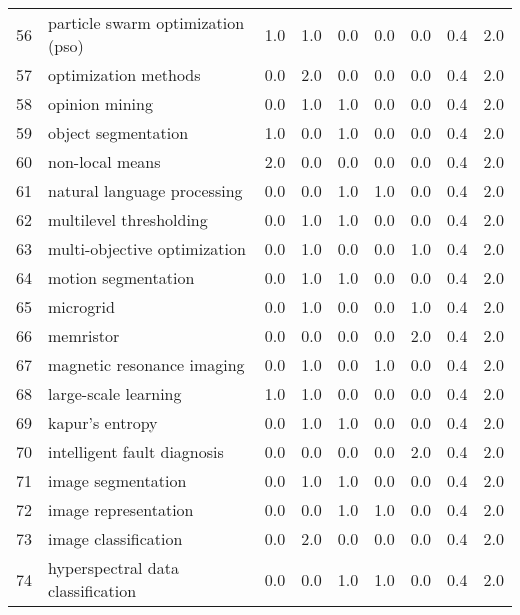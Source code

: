 \begin{tabular}{llrrrrrrr}
56 &  particle swarm optimization (pso) &   1.0 &   1.0 &   0.0 &   0.0 &   0.0 &   0.4 &    2.0 \\
57 &               optimization methods &   0.0 &   2.0 &   0.0 &   0.0 &   0.0 &   0.4 &    2.0 \\
58 &                     opinion mining &   0.0 &   1.0 &   1.0 &   0.0 &   0.0 &   0.4 &    2.0 \\
59 &                object segmentation &   1.0 &   0.0 &   1.0 &   0.0 &   0.0 &   0.4 &    2.0 \\
60 &                    non-local means &   2.0 &   0.0 &   0.0 &   0.0 &   0.0 &   0.4 &    2.0 \\
61 &        natural language processing &   0.0 &   0.0 &   1.0 &   1.0 &   0.0 &   0.4 &    2.0 \\
62 &            multilevel thresholding &   0.0 &   1.0 &   1.0 &   0.0 &   0.0 &   0.4 &    2.0 \\
63 &       multi-objective optimization &   0.0 &   1.0 &   0.0 &   0.0 &   1.0 &   0.4 &    2.0 \\
64 &                motion segmentation &   0.0 &   1.0 &   1.0 &   0.0 &   0.0 &   0.4 &    2.0 \\
65 &                          microgrid &   0.0 &   1.0 &   0.0 &   0.0 &   1.0 &   0.4 &    2.0 \\
66 &                          memristor &   0.0 &   0.0 &   0.0 &   0.0 &   2.0 &   0.4 &    2.0 \\
67 &         magnetic resonance imaging &   0.0 &   1.0 &   0.0 &   1.0 &   0.0 &   0.4 &    2.0 \\
68 &               large-scale learning &   1.0 &   1.0 &   0.0 &   0.0 &   0.0 &   0.4 &    2.0 \\
69 &                    kapur's entropy &   0.0 &   1.0 &   1.0 &   0.0 &   0.0 &   0.4 &    2.0 \\
70 &        intelligent fault diagnosis &   0.0 &   0.0 &   0.0 &   0.0 &   2.0 &   0.4 &    2.0 \\
71 &                 image segmentation &   0.0 &   1.0 &   1.0 &   0.0 &   0.0 &   0.4 &    2.0 \\
72 &               image representation &   0.0 &   0.0 &   1.0 &   1.0 &   0.0 &   0.4 &    2.0 \\
73 &               image classification &   0.0 &   2.0 &   0.0 &   0.0 &   0.0 &   0.4 &    2.0 \\
74 &  hyperspectral data classification &   0.0 &   0.0 &   1.0 &   1.0 &   0.0 &   0.4 &    2.0 \\

\end{tabular}

